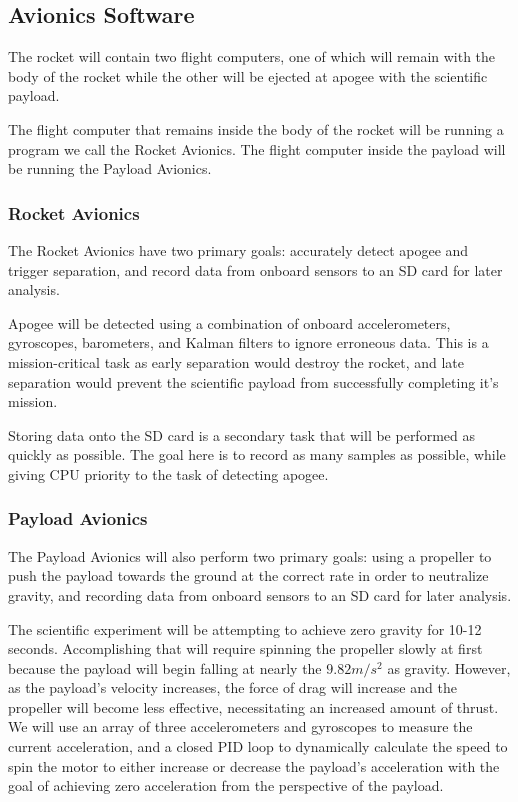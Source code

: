 \documentclass[onecolumn, draftclsnofoot, 10pt, compsoc]{IEEEtran}
\begin{document}
\subsection{Avionics Software}

The rocket will contain two flight computers, one of which will remain with the body of the rocket while the other will be ejected at apogee with the scientific payload.

The flight computer that remains inside the body of the rocket will be running a program we call the Rocket Avionics.  The flight computer inside the payload will be running the Payload Avionics.

\subsubsection{Rocket Avionics}
The Rocket Avionics have two primary goals: accurately detect apogee and trigger separation, and record data from onboard sensors to an SD card for later analysis.

Apogee will be detected using a combination of onboard accelerometers, gyroscopes, barometers, and Kalman filters to ignore erroneous data.  This is a mission-critical task as early separation would destroy the rocket, and late separation would prevent the scientific payload from successfully completing it's mission.

Storing data onto the SD card is a secondary task that will be performed as quickly as possible.  The goal here is to record as many samples as possible, while giving CPU priority to the task of detecting apogee.

\subsubsection{Payload Avionics}
The Payload Avionics will also perform two primary goals: using a propeller to push the payload towards the ground at the correct rate in order to neutralize gravity, and recording data from onboard sensors to an SD card for later analysis.

The scientific experiment will be attempting to achieve zero gravity for 10-12 seconds.  Accomplishing that will require spinning the propeller slowly at first because the payload will begin falling at nearly the $9.82 m/s^2$ as gravity.  However, as the payload's velocity increases, the force of drag will increase and the propeller will become less effective, necessitating an increased amount of thrust.  We will use an array of three accelerometers and gyroscopes to measure the current acceleration, and a closed PID loop to dynamically calculate the speed to spin the motor to either increase or decrease the payload's acceleration with the goal of achieving zero acceleration from the perspective of the payload.
\end{document}
